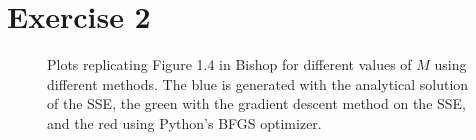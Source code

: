 \documentclass[10pt]{article}
\begin{document}
\begin{table}[!ht]
\centering
{}
\caption{Steps to convergence given a similar set of parameters. GD is gradient descent, \textsc{BFGS} is from SciPy. For gradient descent, all step sizes were $0.5$ and thresholds were $0.01$.}
\label{tbl:1-4-a}
\end{table}

\section{Exercise 2}

\begin{figure}[!ht]
	\centering
	\caption{Plots replicating Figure 1.4 in Bishop for different values of $M$ using different methods. The blue is generated with the analytical solution of the SSE, the green with the gradient descent method on the SSE, and the red using Python's \textsc{BFGS} optimizer.}
	\label{fig:2-1}
\end{figure}
\end{document}
